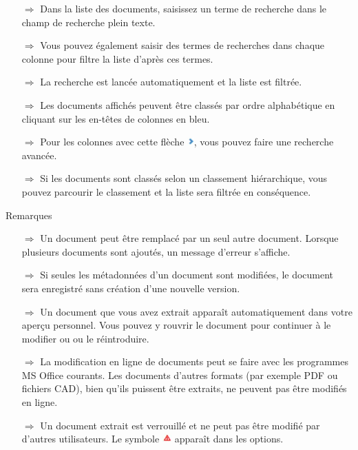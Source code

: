 \documentclass{article}
\begin{document}
\begin{multicols}{2}
\begin{tcolorbox}[colback=blue!5,colframe=blue!40!black,title=Chercher des documents]
\begin{itemize}
  \item[$\Longrightarrow$] Dans la liste des documents, saisissez un terme de recherche dans le champ de recherche plein texte.
  \item[$\Longrightarrow$] Vous pouvez également saisir des termes de recherches dans chaque colonne pour filtre la liste d'après ces termes.
  \item[$\Longrightarrow$] La recherche est lancée automatiquement et la liste est filtrée.
	\item[$\Longrightarrow$] Les documents affichés peuvent être classés par ordre alphabétique en cliquant sur les en-têtes de colonnes en bleu.
	\item[$\Longrightarrow$] Pour les colonnes avec cette flèche \includegraphics[height=9pt]{Icons/Pfeil_rechts.jpg}, vous pouvez faire une recherche avancée.
	\item[$\Longrightarrow$] Si les documents sont classés selon un classement hiérarchique, vous pouvez parcourir le classement et la liste sera filtrée en conséquence.
\end{itemize}
\end{tcolorbox}


\end{multicols}



\begin{beamerlikethm}{Remarques}
\begin{itemize}
  \item[$\Longrightarrow$] Un document peut être remplacé par un seul autre document. Lorsque plusieurs documents sont ajoutés, un message d'erreur s'affiche.
 \item[$\Longrightarrow$] Si seules les métadonnées d'un document sont modifiées, le document sera enregistré sans création d'une nouvelle version.
 \item[$\Longrightarrow$] Un document que vous avez extrait apparaît automatiquement dans votre aperçu personnel. Vous pouvez y rouvrir le document pour continuer à le modifier ou ou le réintroduire.
 \item[$\Longrightarrow$] La modification en ligne de documents peut se faire avec les programmes MS Office courants. Les documents d'autres formats (par exemple PDF ou fichiers CAD), bien qu'ils 
puissent être extraits, ne peuvent pas être modifiés en ligne.
 \item[$\Longrightarrow$] Un document extrait est verrouillé et ne peut pas être modifié par d'autres utilisateurs. Le symbole \includegraphics[height=10pt]{Icons/Warnung_rot.jpg} apparaît dans les options.
\end{itemize}
\end{beamerlikethm}
\end{document}

